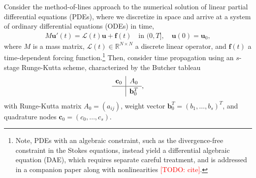 \documentclass[review]{siamart}
\makeatletter
\newcommand{\todo}[1]{\textcolor{red}{[TODO\@: #1]}}
\makeatother
\begin{document}
Consider the method-of-lines approach to the numerical solution of linear
partial differential equations (PDEs), where we discretize in space and arrive
at a system of ordinary differential equations (ODEs) in time,
%
\begin{align*}
M\mathbf{u}'(t) =  \mathcal{L}(t)\mathbf{u} + \mathbf{f}(t)
	\quad\text{in }(0,T], \quad \mathbf{u}(0) = \mathbf{u}_0,
\end{align*}
%
where $M$ is a mass matrix, $\mathcal{L}(t)\in\mathbb{R}^{N\times N}$ a discrete
linear operator, and $\mathbf{f}(t)$ a time-dependent forcing
function.\footnote{Note,
PDEs with an algebraic constraint, such as the divergence-free
constraint in the Stokes equations, instead yield a differential algebraic equation (DAE), which
requires separate careful treatment, and is addressed in a companion paper along with
nonlinearities \todo{cite}.}
Then, consider time propagation using an $s$-stage Runge-Kutta scheme,
characterized by the Butcher tableau
%
\begin{align*}
	\renewcommand\arraystretch{1.2}
	\begin{array}
	{c|c}
	\mathbf{c}_0 & A_0\\
	\hline
	& \mathbf{b}_0^T
	\end{array},
\end{align*}
%
with Runge-Kutta matrix $A_0 = (a_{ij})$, weight vector $\mathbf{b}_0^T = (b_1,
\ldots, b_s)^T$, and quadrature nodes $\mathbf{c}_0 = (c_0, \ldots, c_s)$.
\end{document}

